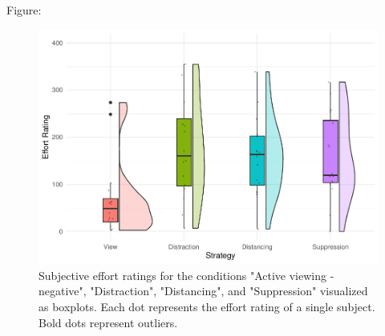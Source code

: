 \documentclass[
  man,floatsintext]{apa6}
\begin{document}
Figure:

\begin{figure}[H]
\includegraphics[width=0.75\linewidth]{Manuscript_ERED_Stage2_files/figure-latex/FigSubjEffortPilot-1} \caption{Subjective effort ratings for the conditions "Active viewing - negative", "Distraction", "Distancing", and "Suppression" visualized as boxplots. Each dot represents the effort rating of a single subject. Bold dots represent outliers.}\label{fig:FigSubjEffortPilot}
\end{figure}
\end{document}
